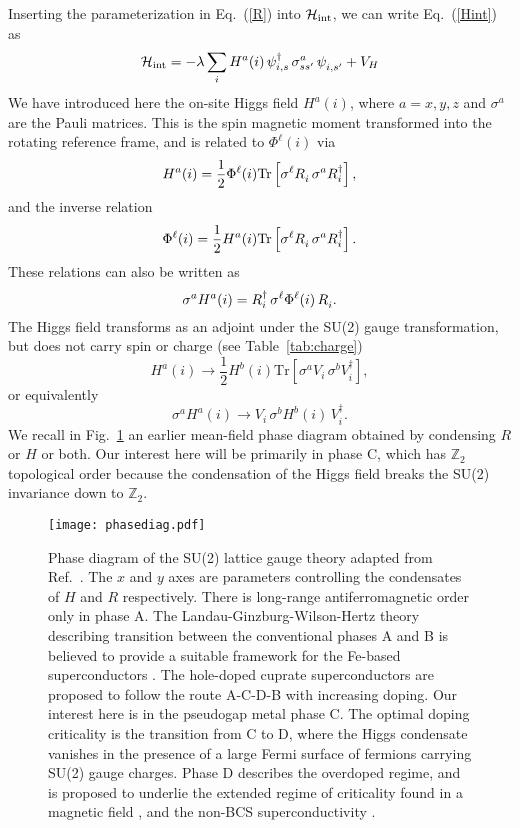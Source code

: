 \documentclass[aps,prb,preprint,onecolumn,citeautoscript,superscriptaddress,footinbib,
eqsecnum]{revtex4-1}
\newcommand{\beq}{\begin{equation}}
\newcommand{\eeq}{\end{equation}}
\begin{document}
Inserting the parameterization in Eq.~(\ref{R}) into $\mathcal{H}_{\rm int}$, we can write Eq.~(\ref{Hint}) as
\beq
\mathcal{H}_{\rm int} = - \lambda \sum_i  H^a (i) \, \psi_{i ,s}^\dagger \, \sigma^a_{ss'} \, \psi_{i  ,s'}^{\vphantom \dagger}  + V_H \label{Hint2}
\eeq
We have introduced here the on-site Higgs
field $H^a (i)$, where $a=x,y,z$ and $\sigma^a$ are the Pauli matrices. This is the spin magnetic moment transformed
into the rotating reference frame, and is related to $\Phi^\ell (i)$ via
\beq
H^a (i) = \frac{1}{2} \Phi^\ell (i) \mbox{Tr} \left[ \sigma^\ell R_i^{\vphantom \dagger} \, \sigma^a R_i^\dagger \right], \label{e2}
\eeq
and the inverse relation
\beq
\Phi^\ell (i)= \frac{1}{2}  H^a (i)  \mbox{Tr} \left[ \sigma^\ell R_i^{\vphantom \dagger} \, \sigma^a R_i^\dagger \right]. \label{e2a}
\eeq
These relations can also be written as
\beq 
\sigma^a H^a (i) =   R_i^\dagger \, \sigma^\ell \Phi^{\ell} (i) \, R_i^{\vphantom \dagger}  . \label{e2b}
\eeq
The Higgs field transforms as an adjoint under the SU(2) gauge transformation, but does not carry spin or charge (see Table~\ref{tab:charge})
\beq
H^a (i) \rightarrow \frac{1}{2} H^b (i) \mbox{Tr} \left[ \sigma^a V_i \, \sigma^b V_i^\dagger  \right], \label{Hgauge}
\eeq
or equivalently
\beq 
\sigma^a H^a (i) \rightarrow   V_i \, \sigma^b H^b (i) \, V_i^\dagger  . \label{Hgauge2}
\eeq
We recall in Fig.~\ref{fig:phasediag} an earlier mean-field 
phase diagram \cite{DCSS16} obtained by condensing $R$ or $H$ or both. Our interest here will be primarily in phase C, which
has $\mathbb{Z}_2$ topological order because the condensation of the Higgs field breaks the SU(2) invariance down to $\mathbb{Z}_2$. 
\begin{figure}
\begin{center}
\texttt{[image: phasediag.pdf]}
\end{center}
\caption{Phase diagram of the SU(2) lattice gauge theory adapted from Ref.~. The $x$ and $y$ axes are parameters controlling the condensates of $H$ and $R$ respectively. There is long-range antiferromagnetic order only in phase A. The Landau-Ginzburg-Wilson-Hertz theory \cite{hertz} describing transition between the conventional phases A and B is believed to provide a suitable framework for the Fe-based superconductors \cite{RMFAC17}. The hole-doped cuprate superconductors are proposed to follow the route A-C-D-B with increasing doping. Our interest here is in the pseudogap metal phase C. The optimal doping criticality \cite{LTCP15} is the transition from C to D, where the Higgs condensate vanishes in the presence of a large Fermi surface of fermions carrying SU(2) gauge charges. Phase D describes the overdoped regime, and is proposed to underlie the extended regime of criticality found in a 
magnetic field \cite{Cooper603}, and the non-BCS superconductivity \cite{Bozovic}.    }
\label{fig:phasediag}
\end{figure}
\end{document}
